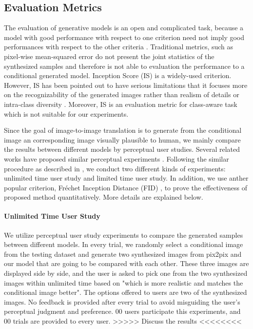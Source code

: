 \subsection{ Evaluation Metrics}
The evaluation of generative models is an open and complicated task, because a model with good performance with respect to one criterion need not imply good performances with respect to the other criteria \cite{evaluation, GANs_equal}. Traditional metrics, such as pixel-wise mean-squared error do not present the joint statistics of the synthesized samples and therefore is not able to evaluation the performance to a conditional generated model. 
Inception Score (IS) \cite{IS} is a widely-used criterion. However, IS has been pointed out to have serious limitations that it focuses more on the recognizability of the generated images rather than realism of details or intra-class diversity \cite{evaluation}. Moreover, IS is an evaluation metric for class-aware task which is not suitable for our experiments.
 
Since the goal of image-to-image translation is to generate from the conditional image an corresponding image visually plausible to human, we mainly compare the results between different models by perceptual user studies. Several related works have proposed similar perceptual experiments \cite{LaplaceGANs, SRGANs, Improved_techniques, CRN, pix2pixHD}. Following the similar procedure as described in \cite{CRN}, we conduct two different kinds of experiments: unlimited time user study and limited time user study. 
In addition, we use anther popular criterion, Fr\'echet Inception Distance (FID) \cite{FID}, to prove the effectiveness of proposed method quantitatively. More details are explained below.
\paragraph{Unlimited Time User Study}
We utilize perceptual user study experiments to compare the generated samples between different models. In every trial, we randomly select a conditional image from the testing dataset and generate two synthesized images from pix2pix and our model that are going to be compared with each other. These three images are displayed side by side, and the user is asked to pick one from the two synthesized images within unlimited time based on "which is more realistic and matches the conditional image better". The options offered to users are two of the synthesized images. No feedback is provided after every trial to avoid misguiding the user's perceptual judgment and preference. 00 users participate this experiments, and 00 trials are provided to every user.
>>>>> Discuss the results <<<<<<<< 
